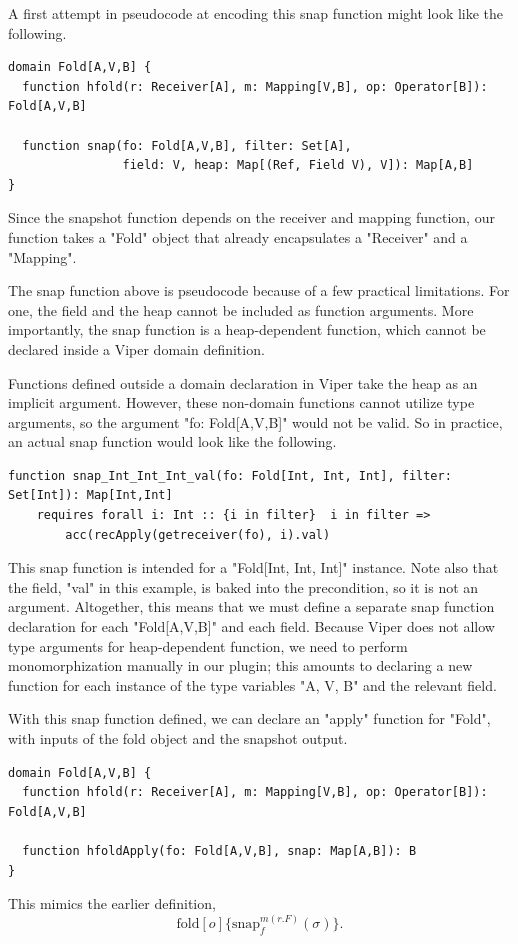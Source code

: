 \documentclass[msc,oneside]{ubcthesis}
\begin{document}
A first attempt in pseudocode at encoding this snap function might look like the following. 
\begin{lstlisting}
domain Fold[A,V,B] {
  function hfold(r: Receiver[A], m: Mapping[V,B], op: Operator[B]): Fold[A,V,B]

  function snap(fo: Fold[A,V,B], filter: Set[A], 
                field: V, heap: Map[(Ref, Field V), V]): Map[A,B]
}
\end{lstlisting}
Since the snapshot function depends on the receiver and mapping function, our function takes a "Fold" object that already encapsulates a "Receiver" and a "Mapping". 

The snap function above is pseudocode because of a few practical limitations. For one, the field and the heap cannot be included as function arguments. More importantly, the snap function is a heap-dependent function, which cannot be declared inside a Viper domain definition. 

Functions defined outside a domain declaration in Viper take the heap as an implicit argument. However, these non-domain functions cannot utilize type arguments, so the argument "fo: Fold[A,V,B]" would not be valid. So in practice, an actual snap function would look like the following.
\begin{lstlisting}
function snap_Int_Int_Int_val(fo: Fold[Int, Int, Int], filter: Set[Int]): Map[Int,Int]
    requires forall i: Int :: {i in filter}  i in filter => 
        acc(recApply(getreceiver(fo), i).val)
\end{lstlisting}
This snap function is intended for a "Fold[Int, Int, Int]" instance. Note also that the field, "val" in this example, is baked into the precondition, so it is not an argument. Altogether, this means that we must define a separate snap function declaration for each "Fold[A,V,B]" and each field. Because Viper does not allow type arguments for heap-dependent function, we need to perform monomorphization manually in our plugin; this amounts to declaring a new function for each instance of the type variables "A, V, B" and the relevant field. 

With this snap function defined, we can declare an "apply" function for "Fold", with inputs of the fold object and the snapshot output.
\begin{lstlisting}
domain Fold[A,V,B] {
  function hfold(r: Receiver[A], m: Mapping[V,B], op: Operator[B]): Fold[A,V,B]

  function hfoldApply(fo: Fold[A,V,B], snap: Map[A,B]): B
}
\end{lstlisting}
This mimics the earlier definition,
$$\textrm{fold}[o]\{\textrm{snap}^{m(r.F)}_{f}(\sigma)\}.$$
\end{document}
